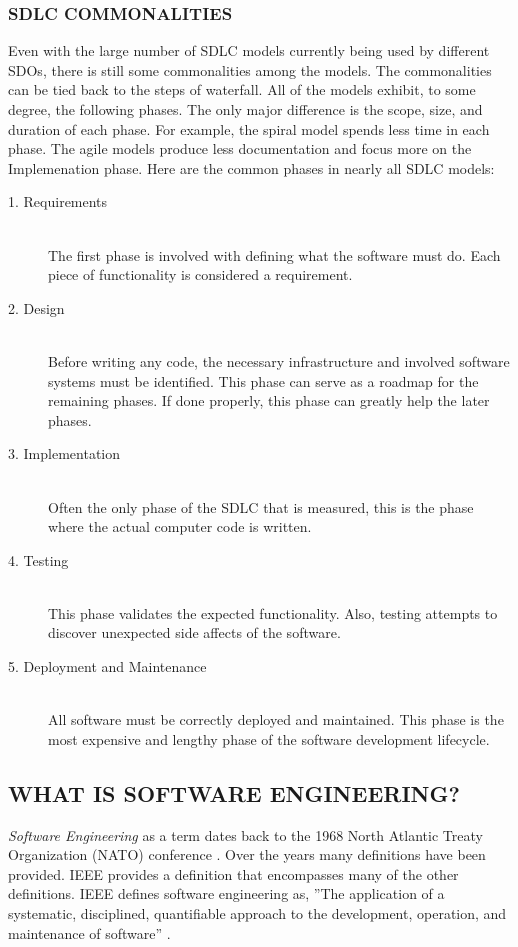 \documentclass[SDSUThesis.tex]{subfiles}
\begin{document}
    \subsubsection{SDLC COMMONALITIES}
        Even with the large number of SDLC models currently being used by different SDOs,
        there is still some commonalities among the models.  The 
        commonalities can be tied back to the steps of waterfall.  All of the models
        exhibit, to some degree, the following phases. The only major difference is 
        the scope, size, and duration of each phase.  For example, the spiral
        model spends less time in each phase.  The agile models produce less
        documentation and focus more on the Implemenation phase. Here are
        the common phases in nearly all SDLC models:
        \begin{description}
            \item[1. Requirements] \hfill \\ The first phase is involved 
                with defining what the software must do.  Each piece of 
                functionality is considered a requirement.  
            \item[2. Design] \hfill \\ Before writing any code, the 
                necessary infrastructure and involved software systems
                must be identified. This phase can serve as a roadmap for the 
                remaining phases. If done properly, this phase can greatly 
                help the later phases.
            \item[3. Implementation] \hfill \\ Often the only phase of the SDLC 
                that is measured, this is the phase where the actual computer
                code is written.
            \item[4. Testing] \hfill \\ This phase validates the expected 
                functionality.  Also, testing attempts to discover unexpected
                side affects of the software.
            \item[5. Deployment and Maintenance] \hfill \\ All software must 
                be correctly deployed and maintained.  This phase is the 
                most expensive and lengthy phase of the software
                development lifecycle.
        \end{description}
        
\subsection{WHAT IS SOFTWARE ENGINEERING?}
    \textit{Software Engineering} as a term dates back to the 
    1968 North Atlantic Treaty Organization (NATO) conference \cite{Tsui2013, Naur1969}. Over the 
    years many definitions have been provided.  IEEE provides a definition that encompasses many of the
    other definitions.  IEEE defines software engineering as, 
    ''The application of a systematic, disciplined, quantifiable approach to the development, operation, and maintenance of software''
    \cite{Ieee1990}.
    
\end{document}

